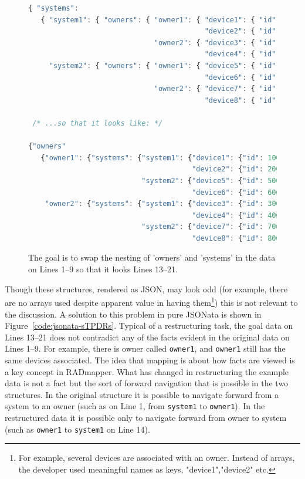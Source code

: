 \documentclass[9pt,letterpaper]{article}
\newcommand{\stt}[1]{\texttt{#1}}
\begin{document}
\begin{figure}[H]
  \caption{The goal is to swap the nesting of 'owners' and 'systems' in the data on Lines 1--9
  so that it looks Lines 13--21.}
 \label{data:restruct}
\begin{lstlisting}[language=JavaScript,basicstyle=\ttfamily\scriptsize,numberstyle=\scriptsize]
{ "systems":
   { "system1": { "owners": { "owner1": { "device1": { "id": 100, "status": "Ok" },
                                          "device2": { "id": 200, "status": "Ok" }},
                              "owner2": { "device3": { "id": 300, "status": "Ok" },
                                          "device4": { "id": 400, "status": "Ok" }}}},
     "system2": { "owners": { "owner1": { "device5": { "id": 500, "status": "Ok" },
                                          "device6": { "id": 600, "status": "Ok" }},
                              "owner2": { "device7": { "id": 700, "status": "Ok" },
                                          "device8": { "id": 800, "status": "Ok" }}}}}}

 /* ...so that it looks like: */

{"owners"
   {"owner1": {"systems": {"system1": {"device1": {"id": 100, "status": "Ok"},
                                       "device2": {"id": 200, "status": "Ok"}},
                           "system2": {"device5": {"id": 500, "status": "Ok"},
                                       "device6": {"id": 600, "status": "Ok"}}},
    "owner2": {"systems": {"system1": {"device3": {"id": 300, "status": "Ok"},
                                       "device4": {"id": 400, "status": "Ok"}},
                           "system2": {"device7": {"id": 700, "status": "Ok"},
                                       "device8": {"id": 800, "status": "Ok"}}}}}))))

\end{lstlisting}
\end{figure}

Though these structures, rendered as JSON, may look odd (for example, there are no arrays used despite apparent value in having them\footnote{For example, several devices are associated with an owner. Instead of arrays, the developer used meaningful names as keys, "device1","device2" etc.}) this is not relevant to the discussion.
A solution to this problem in pure JSONata is shown in Figure~\ref{code:jsonata-sTPDRs}.
Typical of a restructuring task, the goal data on Lines 13--21 does not contradict any of the facts evident in the original data on Lines 1--9.
For example, there is owner called \stt{owner1}, and \stt{owner1} still has the same devices associated.
The idea that mapping is about how facts are viewed is a key concept in RADmapper.
What has changed in restructuring the example data is not a fact but the sort of forward navigation that is possible in the two structures.
In the original structure it is possible to navigate forward from a system to an owner (such as on Line 1, from \stt{system1} to \stt{owner1}).
In the restructured data it is possible only to navigate forward from owner to system (such as \stt{owner1} to \stt{system1} on Line 14).
\end{document}
